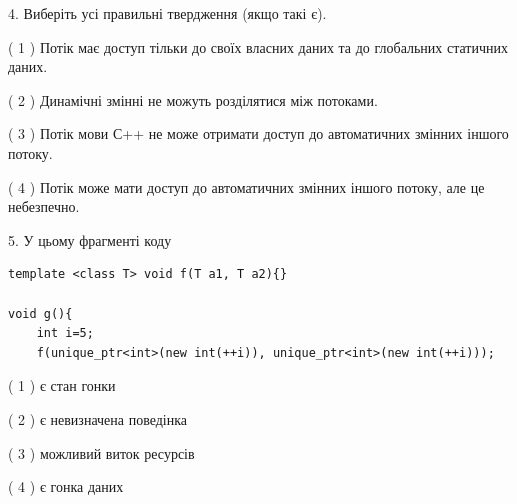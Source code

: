 \documentclass[12pt, ukrainian]{article}
\begin{document}
\begin {large}
{%
4. Виберіть усі правильні твердження (якщо такі є).\par
\vspace{2mm}

( 1 ) Потік має доступ тільки до своїх власних даних та до глобальних статичних даних.%

( 2 ) Динамічні змінні не можуть розділятися між потоками.%

( 3 ) Потік мови С++ не може отримати доступ до автоматичних змінних іншого потоку.%

( 4 ) Потік може мати доступ до автоматичних змінних іншого потоку, але це небезпечно.%


5. У цьому фрагменті коду
\begin{verbatim}
template <class T> void f(T a1, T a2){}

void g(){
    int i=5;
    f(unique_ptr<int>(new int(++i)), unique_ptr<int>(new int(++i)));
\end{verbatim}

( 1 ) є стан гонки%

( 2 ) є невизначена поведінка%

( 3 ) можливий виток ресурсів%

( 4 ) є гонка даних%
}
\end {large}
\end{document}
